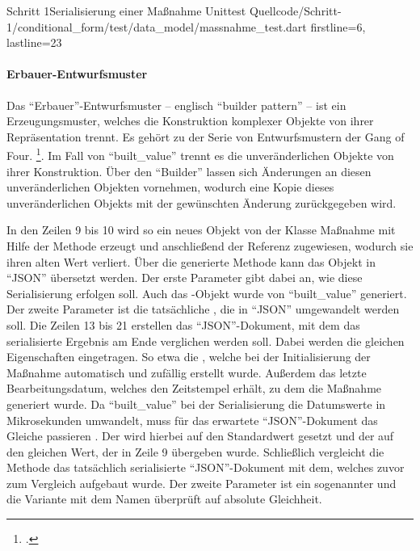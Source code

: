 \begin{alexlisting}{Schritt 1}{Serialisierung einer Maßnahme Unittest}
  {Quellcode/Schritt-1/conditional_form/test/data_model/massnahme_test.dart}
  {firstline=6, lastline=23}
  \label{lst:SerialisierungEinerMassnahmeUnittest}
\end{alexlisting}

\paragraph{Erbauer-Entwurfsmuster} Das \enquote{Erbauer}-Entwurfsmuster -- englisch \enquote{builder pattern} -- ist ein Erzeugungsmuster, welches die Konstruktion komplexer Objekte von ihrer Repräsentation trennt.
Es gehört zu der Serie von Entwurfsmustern der Gang of Four. \footcite[Vgl.][S. 119]{gamma2009entwurfsmuster}.
Im Fall von \enquote{built_value} trennt es die unveränderlichen Objekte von ihrer Konstruktion.
Über den \enquote{Builder} lassen sich Änderungen an diesen unveränderlichen Objekten vornehmen, wodurch eine Kopie dieses unveränderlichen Objekts mit der gewünschten Änderung zurückgegeben wird.

In den Zeilen 9 bis 10 wird so ein neues Objekt von der Klasse Maßnahme mit Hilfe der Methode  erzeugt und anschließend der Referenz  zugewiesen, wodurch sie ihren alten Wert verliert.
Über die generierte Methode   kann das Objekt in \enquote{JSON} übersetzt werden.
Der erste Parameter  gibt dabei an, wie diese Serialisierung erfolgen soll. Auch das -Objekt wurde von \enquote{built_value} generiert.
Der zweite Parameter ist die tatsächliche , die in \enquote{JSON} umgewandelt werden soll.
Die Zeilen 13 bis 21 erstellen das \enquote{JSON}-Dokument, mit dem das serialisierte Ergebnis am Ende verglichen werden soll. Dabei werden die gleichen Eigenschaften eingetragen.
So etwa die , welche bei der Initialisierung der Maßnahme automatisch und zufällig erstellt wurde. Außerdem das letzte Bearbeitungsdatum, welches den Zeitstempel erhält, zu dem die Maßnahme generiert wurde.
Da \enquote{built_value} bei der Serialisierung die Datumswerte in Mikrosekunden umwandelt, muss für das erwartete \enquote{JSON}-Dokument das Gleiche passieren .
Der   wird hierbei auf den Standardwert  gesetzt und der   auf den gleichen Wert, der in Zeile 9 übergeben wurde.
Schließlich vergleicht die Methode  das tatsächlich serialisierte \enquote{JSON}-Dokument mit dem, welches zuvor zum Vergleich aufgebaut wurde.
Der zweite Parameter ist ein sogenannter  und die Variante mit dem Namen  überprüft auf absolute Gleichheit.



